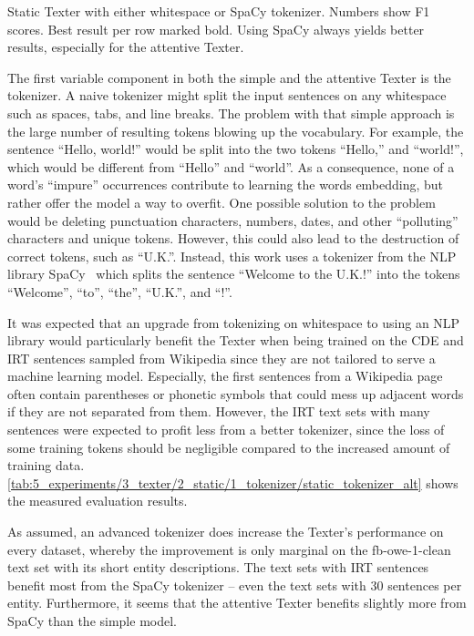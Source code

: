 \begin{table}[t]
    \centering
    
    \caption{Static Texter with either whitespace or SpaCy tokenizer. Numbers show F1 scores. Best result per row marked bold. Using SpaCy always yields better results, especially for the attentive Texter.}
    \label{tab:5_experiments/3_texter/2_static/1_tokenizer/static_tokenizer_alt}
\end{table}

The first variable component in both the simple and the attentive Texter is the tokenizer. A naive tokenizer might split the input sentences on any whitespace such as spaces, tabs, and line breaks. The problem with that simple approach is the large number of resulting tokens blowing up the vocabulary. For example, the sentence ``Hello, world!'' would be split into the two tokens ``Hello,'' and ``world!'', which would be different from ``Hello'' and ``world''. As a consequence, none of a word's ``impure'' occurrences contribute to learning the words embedding, but rather offer the model a way to overfit. One possible solution to the problem would be deleting punctuation characters, numbers, dates, and other ``polluting'' characters and unique tokens. However, this could also lead to the destruction of correct tokens, such as ``U.K.''. Instead, this work uses a tokenizer from the NLP library SpaCy~\cite{SpaCy} which splits the sentence ``Welcome to the U.K.!'' into the tokens ``Welcome'', ``to'', ``the'', ``U.K.'', and ``!''.

It was expected that an upgrade from tokenizing on whitespace to using an NLP library would particularly benefit the Texter when being trained on the CDE and IRT sentences sampled from Wikipedia since they are not tailored to serve a machine learning model. Especially, the first sentences from a Wikipedia page often contain parentheses or phonetic symbols that could mess up adjacent words if they are not separated from them. However, the IRT text sets with many sentences were expected to profit less from a better tokenizer, since the loss of some training tokens should be negligible compared to the increased amount of training data. \autoref{tab:5_experiments/3_texter/2_static/1_tokenizer/static_tokenizer_alt} shows the measured evaluation results.

As assumed, an advanced tokenizer does increase the Texter's performance on every dataset, whereby the improvement is only marginal on the fb-owe-1-clean text set with its short entity descriptions. The text sets with IRT sentences benefit most from the SpaCy tokenizer -- even the text sets with 30 sentences per entity. Furthermore, it seems that the attentive Texter benefits slightly more from SpaCy than the simple model.
